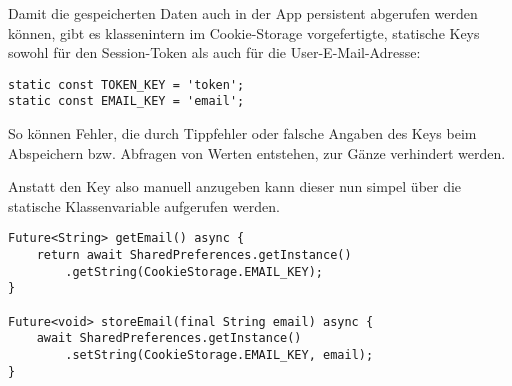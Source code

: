 Damit die gespeicherten Daten auch in der App persistent abgerufen werden können, gibt es klassenintern
im Cookie-Storage vorgefertigte, statische Keys sowohl für den Session-Token als auch für die User-E-Mail-Adresse:

\begin{lstlisting}
static const TOKEN_KEY = 'token';
static const EMAIL_KEY = 'email';
\end{lstlisting}

So können Fehler, die durch Tippfehler oder falsche Angaben des Keys beim Abspeichern bzw. Abfragen
von Werten entstehen, zur Gänze verhindert werden.

Anstatt den Key also manuell anzugeben kann dieser nun simpel über die statische Klassenvariable
aufgerufen werden.

\begin{lstlisting}
Future<String> getEmail() async {
    return await SharedPreferences.getInstance()
        .getString(CookieStorage.EMAIL_KEY);
}

Future<void> storeEmail(final String email) async {
    await SharedPreferences.getInstance()
        .setString(CookieStorage.EMAIL_KEY, email);
}
\end{lstlisting}






